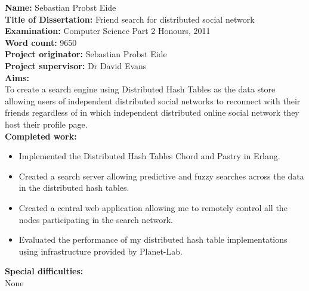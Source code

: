 \begin{flushleft}{

  \textbf{Name:} Sebastian Probst Eide \\
  \vspace*{5mm}
  \textbf{Title of Dissertation:} Friend search for distributed social network \\
  \vspace*{5mm}
  \textbf{Examination:} Computer Science Part 2 Honours, 2011 \\
  \vspace*{5mm}
  \textbf{Word count:} 9650 \\
  \vspace*{5mm}
  \textbf{Project originator:} Sebastian Probst Eide \\
  \vspace*{5mm}
  \textbf{Project supervisor:} Dr David Evans \\
  \vspace*{15mm}
  \textbf{Aims:} \\
  \vspace*{2mm}
  To create a search engine using Distributed Hash Tables as the data store allowing users of independent distributed social networks to reconnect with their friends regardless of in which independent distributed online social network they host their profile page. \\
  \vspace*{10mm}
  \textbf{Completed work:} \\
  \vspace*{2mm}
  \begin{itemize}
  \item Implemented the Distributed Hash Tables Chord and Pastry in Erlang.
  \item Created a search server allowing predictive and fuzzy searches across the data in the distributed hash tables. 
  \item Created a central web application allowing me to remotely control all the nodes participating in the search network. 
  \item Evaluated the performance of my distributed hash table implementations using infrastructure provided by Planet-Lab.
  \end{itemize}
  \vspace*{10mm}
  \textbf{Special difficulties:} \\
  \vspace*{2mm}
  None

} \end{flushleft}

\clearpage
